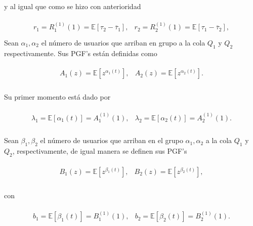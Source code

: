 \documentclass{article}
\newcommand{\esp}{\mathbb{E}}
\begin{document}
y al igual que como se hizo con anterioridad

\begin{eqnarray*}
\begin{array}{cc}
r_{1}=R_{1}^{(1)}\left(1\right)=\esp\left[\tau_{2}-\overline{\tau}_{1}\right],
&
r_{2}=R_{2}^{(1)}\left(1\right)=\esp\left[\tau_{1}-\overline{\tau}_{2}\right],\\
\end{array}
\end{eqnarray*}
Sean $\alpha_{1},\alpha_{2}$ el n\'umero de usuarios que arriban
en grupo a la cola $Q_{1}$ y $Q_{2}$ respectivamente. Sus PGF's
est\'an definidas como

\begin{eqnarray*}
\begin{array}{cc}
A_{1}\left(z\right)=\esp\left[z^{\alpha_{1}\left(t\right)}\right],&
A_{2}\left(z\right)=\esp\left[z^{\alpha_{2}\left(t\right)}\right].\\
\end{array}
\end{eqnarray*}

Su primer momento est\'a dado por

\begin{eqnarray*}
\begin{array}{cc}
\lambda_{1}=\esp\left[\alpha_{1}\left(t\right)\right]=A_{1}^{(1)}\left(1\right),&
\lambda_{2}=\esp\left[\alpha_{2}\left(t\right)\right]=A_{2}^{(1)}\left(1\right).\\
\end{array}
\end{eqnarray*}

Sean $\beta_{1},\beta_{2}$ el n\'umero de usuarios que arriban en el grupo $\alpha_{1},\alpha_{2}$ a la cola $Q_{1}$ y $Q_{2}$, respectivamente, de igual manera se definen sus PGF's

\begin{eqnarray*}
\begin{array}{cc}
B_{1}\left(z\right)=\esp\left[z^{\beta_{1}\left(t\right)}\right],&
B_{2}\left(z\right)=\esp\left[z^{\beta_{2}\left(t\right)}\right],\\
\end{array}
\end{eqnarray*}

con

\begin{eqnarray*}
\begin{array}{cc}
b_{1}=\esp\left[\beta_{1}\left(t\right)\right]=B_{1}^{(1)}\left(1\right),&
b_{2}=\esp\left[\beta_{2}\left(t\right)\right]=B_{2}^{(1)}\left(1\right).\\
\end{array}
\end{eqnarray*}
\end{document}
